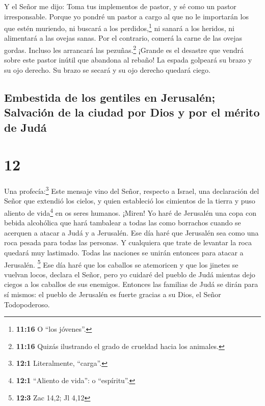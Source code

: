  Y el Señor me dijo: Toma tus implementos de pastor, y sé
como un pastor irresponsable.  Porque yo pondré un pastor
a cargo al que no le importarán los que estén muriendo, ni buscará a los
perdidos,\footnote{\textbf{11:16} O ``los jóvenes''.} ni sanará a los
heridos, ni alimentará a las ovejas sanas. Por el contrario, comerá la
carne de las ovejas gordas. Incluso les arrancará las
pezuñas.\footnote{\textbf{11:16} Quizás ilustrando el grado de crueldad
  hacia los animales.}  ¡Grande es el desastre que vendrá
sobre este pastor inútil que abandona al rebaño! La espada golpeará su
brazo y su ojo derecho. Su brazo se secará y su ojo derecho quedará
ciego.

\hypertarget{embestida-de-los-gentiles-en-jerusaluxe9n-salvaciuxf3n-de-la-ciudad-por-dios-y-por-el-muxe9rito-de-juduxe1}{%
\subsection{Embestida de los gentiles en Jerusalén; Salvación de la
ciudad por Dios y por el mérito de
Judá}\label{embestida-de-los-gentiles-en-jerusaluxe9n-salvaciuxf3n-de-la-ciudad-por-dios-y-por-el-muxe9rito-de-juduxe1}}

\hypertarget{section-11}{%
\section{12}\label{section-11}}

 Una profecía:\footnote{\textbf{12:1} Literalmente,
  ``carga''.} Este mensaje vino del Señor, respecto a Israel, una
declaración del Señor que extendió los cielos, y quien estableció los
cimientos de la tierra y puso aliento de vida\footnote{\textbf{12:1}
  ``Aliento de vida'': o ``espíritu''.} en os seres humanos.
 ¡Miren! Yo haré de Jerusalén una copa con bebida
alcohólica que hará tambalear a todas las como borrachos cuando se
acerquen a atacar a Judá y a Jerusalén.  Ese día haré que
Jerusalén sea como una roca pesada para todas las personas. Y cualquiera
que trate de levantar la roca quedará muy lastimado. Todas las naciones
se unirán entonces para atacar a Jerusalén. \footnote{\textbf{12:3} Zac
  14,2; Jl 4,12}  Ese día haré que los caballos se
atemoricen y que los jinetes se vuelvan locos, declara el Señor, pero yo
cuidaré del pueblo de Judá mientas dejo ciegos a los caballos de sus
enemigos.  Entonces las familias de Judá se dirán para sí
mismos: el pueblo de Jerusalén es fuerte gracias a su Dios, el Señor
Todopoderoso.

